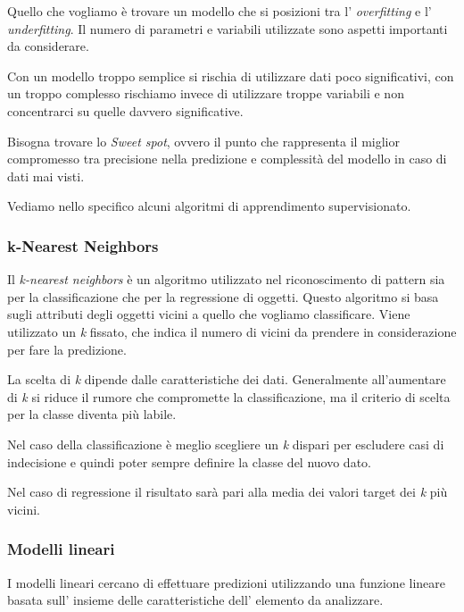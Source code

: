 \documentclass[a4paper,12pt]{report}
\begin{document}
Quello che vogliamo è trovare un modello che si posizioni tra l' \textit{overfitting} e l' \textit{underfitting}.
Il numero di parametri e variabili utilizzate sono aspetti importanti da considerare.

Con un modello troppo semplice si rischia di utilizzare dati poco significativi, con un troppo complesso rischiamo invece di utilizzare troppe variabili e non concentrarci su quelle davvero significative.

Bisogna trovare lo \textit{Sweet spot}, ovvero il punto che rappresenta il miglior compromesso tra precisione nella predizione e complessità del modello in caso di dati mai visti.

\bigskip

Vediamo nello specifico alcuni algoritmi di apprendimento supervisionato.

\subsubsection{k-Nearest Neighbors}

Il \textit{k-nearest neighbors} è un algoritmo utilizzato nel riconoscimento di pattern sia per la classificazione che per la regressione di oggetti. 
Questo algoritmo si basa sugli attributi degli oggetti vicini a quello che vogliamo classificare.
Viene utilizzato un \textit{k} fissato, che indica il numero di vicini da prendere in considerazione per fare la predizione.

La scelta di \textit{k} dipende dalle caratteristiche dei dati. Generalmente all'aumentare di \textit{k} si riduce il rumore che compromette la classificazione, ma il criterio di scelta per la classe diventa più labile.

Nel caso della classificazione è meglio scegliere un \textit{k} dispari per escludere casi di indecisione e quindi poter sempre definire la classe del nuovo dato.

Nel caso di regressione il risultato sarà pari alla media dei valori target dei \textit{k} più vicini.


\subsubsection{Modelli lineari}
I modelli lineari cercano di effettuare predizioni utilizzando una funzione lineare basata sull' insieme delle caratteristiche dell' elemento da analizzare.
\end{document}
